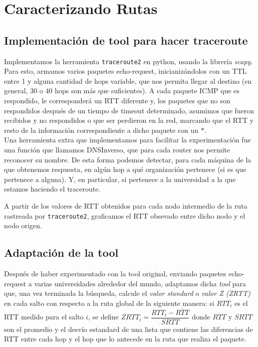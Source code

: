 \documentclass[final,inline,a4paper,narroweqnarray]{ieee}
\let\Oldsection\section
\renewcommand{\section}{\FloatBarrier\Oldsection}
\let\Oldsubsection\subsection
\renewcommand{\subsection}{\FloatBarrier\Oldsubsection}
\begin{document}
\section{Caracterizando Rutas}

  \subsection{Implementación de tool para hacer traceroute}
  Implementamos la herramienta \texttt{traceroute2} en python, usando la librería
  \emph{scapy}. Para esto, armamos varios paquetes echo-request, inicianizándolos con un TTL
  entre 1 y alguna cantidad de hops variable, que nos permita llegar al destino (en
  general, 30 o 40 hops son más que suficientes). A cada paquete ICMP que es respondido,
  le corresponderá un RTT diferente y, los paquetes que no son respondidos después de un tiempo
  de timeout determinado, asumimos que fueron recibidos y no respondidos o que ser perdieron en la red,
  marcando que el RTT y resto de la información correspondiente a dicho paquete con un $*$. \\
  Una herramienta extra que implementamos para facilitar la experimentación
  fue una función que llamamos DNSInverso, que para cada router nos permite reconocer su nombre.
  De esta forma podemos detectar, para cada máquina de la que obtenemos respuesta, en algún hop
  a qué organización pertenece (si es que pertenece a alguna). Y, en particular,
  si pertenece a la universidad a la que estamos haciendo el traceroute.
  
  A partir de los valores de RTT obtenidos para cada nodo intermedio de la ruta rastreada por
  \texttt{traceroute2}, graficamos el RTT obsevado entre dicho nodo y el nodo origen.

  \subsection{Adaptación de la tool}
  Después de haber experimentado con la tool original, enviando paquetes
  echo-request a varias universidades alrededor del mundo, 
  adaptamos dicha \emph{tool} para que, una vez terminada 
  la búsqueda, calcule el \emph{valor standard}  o \emph{valor Z (ZRTT) } 
  en cada salto con respecto a la ruta global de la siguiente manera: si $RTT_i$ 
  es el RTT medido para el salto $i$, se define $ ZRTT_i = \dfrac{RTT_i 
  - \overline{RTT}}{SRTT} $ donde $\overline{RTT}$ y $SRTT$ son el promedio 
  y el desvío estandard de una lista que contiene las diferencias de RTT entre
  cada hop y el hop que lo antecede en la ruta que realiza el paquete.
  
\end{document}
